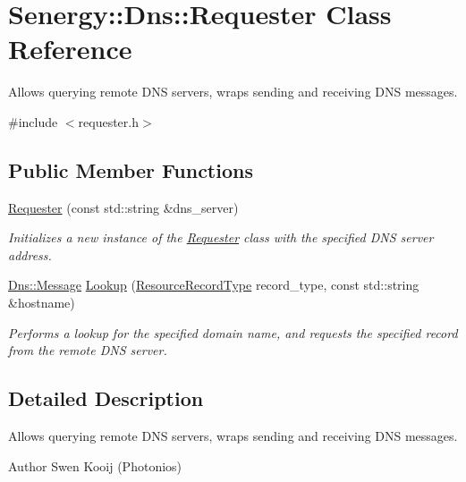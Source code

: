 \hypertarget{class_senergy_1_1_dns_1_1_requester}{\section{Senergy\-:\-:Dns\-:\-:Requester Class Reference}
\label{class_senergy_1_1_dns_1_1_requester}
}


Allows querying remote D\-N\-S servers, wraps sending and receiving D\-N\-S messages.  




{\ttfamily \#include $<$requester.\-h$>$}

\subsection*{Public Member Functions}
\begin{DoxyCompactItemize}
\item 
\hyperlink{class_senergy_1_1_dns_1_1_requester_a1b5fbbb5b5b115bdee9da48ce1466be0}{Requester} (const std\-::string \&dns\-\_\-server)
\begin{DoxyCompactList}\small\item\em Initializes a new instance of the \hyperlink{class_senergy_1_1_dns_1_1_requester}{Requester} class with the specified D\-N\-S server address. \end{DoxyCompactList}\item 
\hyperlink{class_senergy_1_1_dns_1_1_message}{Dns\-::\-Message} \hyperlink{class_senergy_1_1_dns_1_1_requester_abcd4348e956e6d21eef3ecc7a1f3cc0e}{Lookup} (\hyperlink{namespace_senergy_1_1_dns_a590bfd748c955364770f5ce358d9dfe0}{Resource\-Record\-Type} record\-\_\-type, const std\-::string \&hostname)
\begin{DoxyCompactList}\small\item\em Performs a lookup for the specified domain name, and requests the specified record from the remote D\-N\-S server. \end{DoxyCompactList}\end{DoxyCompactItemize}


\subsection{Detailed Description}
Allows querying remote D\-N\-S servers, wraps sending and receiving D\-N\-S messages. 

\begin{DoxyAuthor}{Author}
Swen Kooij (Photonios) 
\end{DoxyAuthor}


